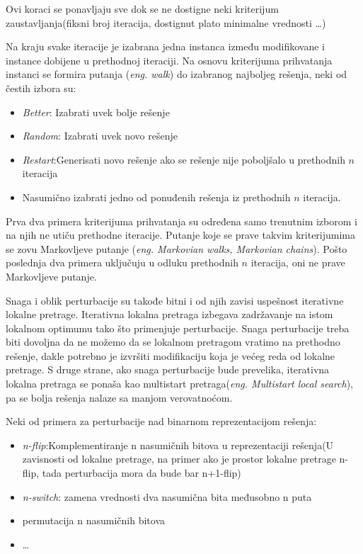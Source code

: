\documentclass[a4paper]{article}
\begin{document}
Ovi koraci se ponavljaju sve dok se ne dostigne neki kriterijum zaustavljanja(fiksni broj iteracija, dostignut plato minimalne vrednosti \ldots)

Na kraju svake iteracije je izabrana jedna instanca između modifikovane i instance dobijene u prethodnoj iteraciji. Na osnovu kriterijuma prihvatanja instanci se formira putanja (\emph{eng. walk}) do izabranog najboljeg rešenja, neki od čestih izbora su:
\begin{itemize}
\item \emph{Better}: Izabrati uvek bolje rešenje
\item \emph{Random}: Izabrati uvek novo rešenje
\item \emph{Restart}:Generisati novo rešenje ako se rešenje nije poboljšalo u prethodnih $n$ iteracija
\item Nasumično izabrati jedno od ponuđenih rešenja iz prethodnih $n$ iteracija.
\end{itemize}

Prva dva primera kriterijuma prihvatanja su određena samo trenutnim izborom i na njih ne utiču prethodne iteracije. Putanje koje se prave takvim kriterijumima se zovu Markovljeve putanje (\emph{eng. Markovian walks, Markovian chains}). Pošto poslednja dva primera uključuju u odluku prethodnih $n$ iteracija, oni ne prave Markovljeve putanje. 

Snaga i oblik perturbacije su takođe bitni i od njih zavisi uspešnost iterativne lokalne pretrage. Iterativna lokalna pretraga izbegava zadržavanje na istom lokalnom optimumu tako što primenjuje perturbacije. Snaga perturbacije treba biti dovoljna da ne možemo da se lokalnom pretragom vratimo na prethodno rešenje, dakle potrebno je izvršiti modifikaciju koja je većeg reda od lokalne pretrage. S druge strane, ako snaga perturbacije bude prevelika, iterativna lokalna pretraga se ponaša kao multistart pretraga(\emph{eng. Multistart local search}), pa se bolja rešenja nalaze sa manjom verovatnoćom. 

Neki od primera za perturbacije nad binarnom reprezentacijom rešenja:
\begin{itemize}
\item\emph{n-flip}:Komplementiranje n nasumičnih bitova u reprezentaciji rešenja(U zavisnosti od lokalne pretrage, na primer
ako je prostor lokalne pretrage n-flip, tada perturbacija mora da bude bar n+1-flip)
\item \emph{n-switch}: zamena vrednosti dva nasumična bita međusobno n puta
\item permutacija n nasumičnih bitova
\item \ldots
\end{itemize}
\end{document}

